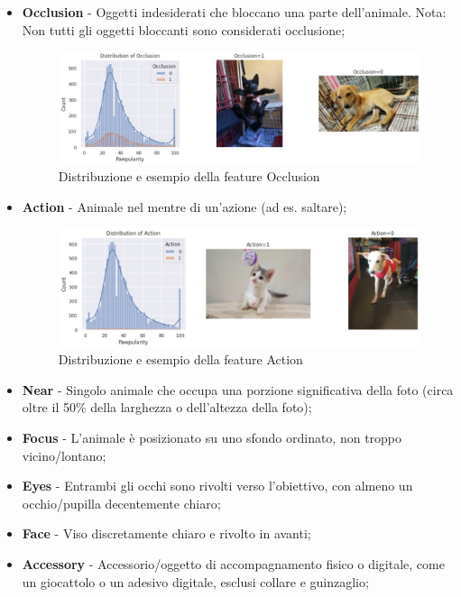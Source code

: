     \begin{itemize}
        \item \textbf{Occlusion} - Oggetti indesiderati che bloccano una parte dell'animale. Nota: Non tutti gli oggetti bloccanti sono considerati occlusione;
        \begin{figure}[H]
            \centering
            \includegraphics[scale=0.5]{Plot/distribution_occlusion.jpg}
            \caption{Distribuzione e esempio della feature Occlusion}
            \label{fig:occlusion}
        \end{figure}
        \item \textbf{Action} - Animale nel mentre di un'azione (ad es. saltare);
        \begin{figure}[H]
            \centering
            \includegraphics[scale=0.5]{Plot/distribution_action.jpg}
            \caption{Distribuzione e esempio della feature Action}
            \label{fig:action}
        \end{figure}
        \item \textbf{Near} - Singolo animale che occupa una porzione significativa della foto (circa oltre il 50\% della larghezza o dell'altezza della foto);
        \item \textbf{Focus} - L'animale è posizionato su uno sfondo ordinato, non troppo vicino/lontano;
        \item \textbf{Eyes} - Entrambi gli occhi sono rivolti verso l'obiettivo, con almeno un occhio/pupilla decentemente chiaro;
        \item \textbf{Face} - Viso discretamente chiaro e rivolto in avanti;
        \item \textbf{Accessory} - Accessorio/oggetto di accompagnamento fisico o digitale, come un giocattolo o un adesivo digitale, esclusi collare e guinzaglio;

\end{itemize}
